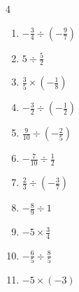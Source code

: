 \begin{multicols}{4}
\begin{enumerate}

  \item $\displaystyle -\frac{3}{4}\div{}\left(-\frac{9}{7}\right)$


  \item $\displaystyle 5\div{}\frac{5}{2}$

        \phantom{$\displaystyle =2$}

  \item $\displaystyle \frac{3}{5}\times{}\left(-\frac{1}{8}\right)$


  \item $\displaystyle -\frac{3}{2}\div{}\left(-\frac{1}{2}\right)$

        \phantom{$\displaystyle =3$}

\columnbreak %

  \item $\displaystyle \frac{9}{10}\div{}\left(-\frac{2}{5}\right)$


  \item $\displaystyle -\frac{7}{10}\div{}\frac{1}{2}$


  \item $\displaystyle \frac{2}{3}\div{}\left(-\frac{3}{7}\right)$


  \item $\displaystyle -\frac{8}{9}\div{}1$


  \item $\displaystyle -5\times{}\frac{3}{4}$


  \item $\displaystyle -\frac{6}{5}\div{}\frac{8}{5}$


  \item $\displaystyle -5\times{}\left(-3\right)$

        \phantom{$\displaystyle =15$}


\end{enumerate}
\end{multicols}
